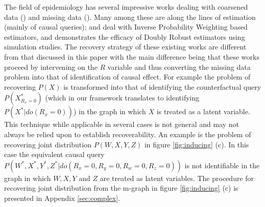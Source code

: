 \documentclass[12pt]{article}
\begin{document}
The field of epidemiology has several impressive works dealing with coarsened data (\cite{gill1997coarsening, gill1997sequential}) and missing data (\cite{robins2000robust, robins1997non, robins2000sensitivity,li2013weighting}). Many among these  are along the lines of estimation (mainly of causal queries);  \cite{robins1994estimation} and \cite{rotnitzky1998semiparametric} deal with Inverse Probability Weighting based estimators, and  \cite{bang2005doubly} demonstrates the efficacy of Doubly Robust estimators using simulation studies. The recovery strategy of these existing works are different from that discussed in this paper with the main difference being that  these works proceed by intervening on the $R$ variable and thus converting the missing data problem into that of identification of causal effect. For example the problem of  recovering $P(X)$ is transformed into that of identifying the counterfactual query $P(X^*_{R_x=0})$ (which in our framework translates to identifying  $P(X^*|do(R_x=0))$) in the graph in which $X$ is treated as a latent variable. This technique while applicable in several cases is not general and may not always be relied upon to establish recoverability.  An example is the problem of recovering joint distribution $P(W,X,Y,Z)$ in figure \ref{fig:inducing} (c). In this case the equivalent causal query $P(W^*,X^*,Y^*,Z^*|do(R_x=0,R_y=0,R_w=0,R_z=0))$ is not identifiable in the graph in which $W,X,Y$ and $Z$ are treated as latent variables. The procedure for recovering  joint distribution from the m-graph in figure \ref{fig:inducing} (c) is presented in Appendix \ref{sec:complex}. %


\end{document}
